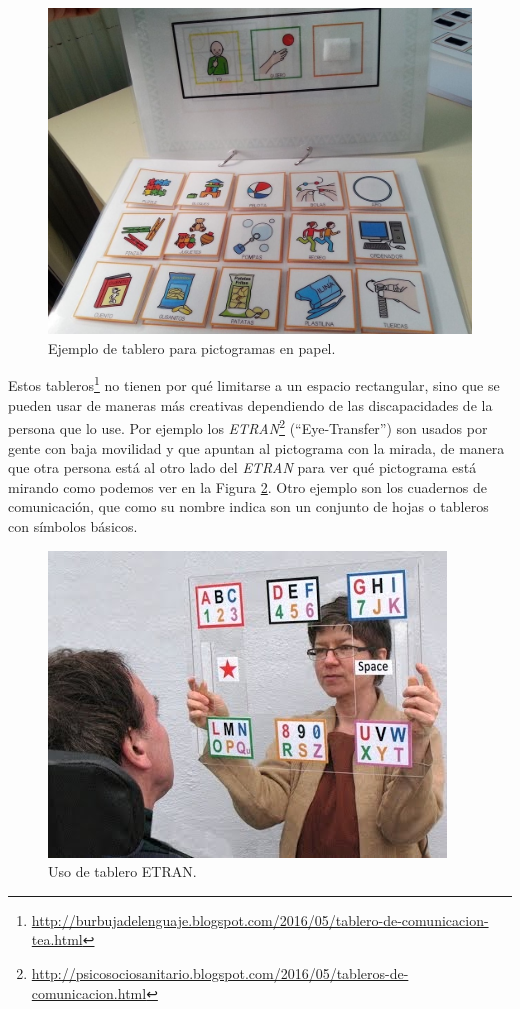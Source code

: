 \begin{figure}[h!]
	\centering
	\includegraphics[width=0.7\linewidth]{Imagenes/Bitmap/EditoresPictogramas}
	\caption{Ejemplo de tablero para pictogramas en papel.}
	\label{fig:editorespictogramas}
\end{figure}

Estos tableros\footnote{\url{http://burbujadelenguaje.blogspot.com/2016/05/tablero-de-comunicacion-tea.html}} no tienen por qué limitarse a un espacio rectangular, sino que se pueden usar de maneras más creativas dependiendo de las discapacidades de la persona que lo use. Por ejemplo los \textit{ETRAN}\footnote{\url{http://psicosociosanitario.blogspot.com/2016/05/tableros-de-comunicacion.html}} (“Eye-Transfer”) son usados por gente con baja movilidad y que apuntan al pictograma con la mirada, de manera que otra persona está al otro lado del \textit{ETRAN} para ver qué pictograma está mirando como podemos ver en la Figura \ref{fig:tablero}. Otro ejemplo son los cuadernos de comunicación, que como su nombre indica son un conjunto de hojas o tableros con símbolos básicos.

\begin{figure}[h!]
	\centering
	\includegraphics[width=0.7\linewidth]{Imagenes/Bitmap/Tablero}
	\caption{Uso de tablero ETRAN.}
	\label{fig:tablero}
\end{figure}

